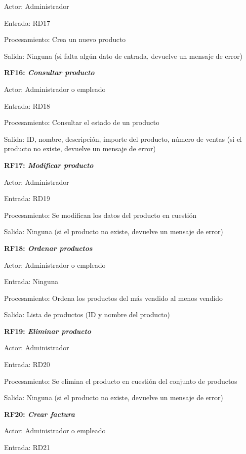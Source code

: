 \documentclass[paper=a4, fontsize=11pt, spanish]{scrartcl}
\begin{document}
	Actor: Administrador
	
	Entrada: RD17
	
	Procesamiento: Crea un nuevo producto
	
	Salida: Ninguna (si falta algún dato de entrada, devuelve un mensaje de error)
	
	\setlength{\parindent}{0em}
	\textbf{RF16: \textit{Consultar producto}}
	\setlength{\parindent}{2em}
	
	Actor: Administrador o empleado
	
	Entrada: RD18
	
	Procesamiento: Consultar el estado de un producto
	
	Salida: ID, nombre, descripción, importe del producto, número de ventas (si el producto no existe, devuelve un mensaje de error)
	
	\setlength{\parindent}{0em}
	\textbf{RF17: \textit{Modificar producto}}
	\setlength{\parindent}{2em}
	
	Actor: Administrador
	
	Entrada: RD19
	
	Procesamiento: Se modifican los datos del producto en cuestión
	
	Salida: Ninguna (si el producto no existe, devuelve un mensaje de error)
	
	\setlength{\parindent}{0em}
	\textbf{RF18: \textit{Ordenar productos}}
	\setlength{\parindent}{2em}
	
	Actor: Administrador o empleado
	
	Entrada: Ninguna
	
	Procesamiento: Ordena los productos del más vendido al menos vendido
	
	Salida: Lista de productos (ID y nombre del producto)
	
	\setlength{\parindent}{0em}
	\textbf{RF19: \textit{Eliminar producto}}
	\setlength{\parindent}{2em}
	
	Actor: Administrador
	
	Entrada: RD20
	
	Procesamiento: Se elimina el producto en cuestión del conjunto de productos 
	
	Salida: Ninguna (si el producto no existe, devuelve un mensaje de error)
	
	\setlength{\parindent}{0em}
	\textbf{RF20: \textit{Crear factura}}
	\setlength{\parindent}{2em}
	
	Actor: Administrador o empleado
	
	Entrada: RD21
	
\end{document}
